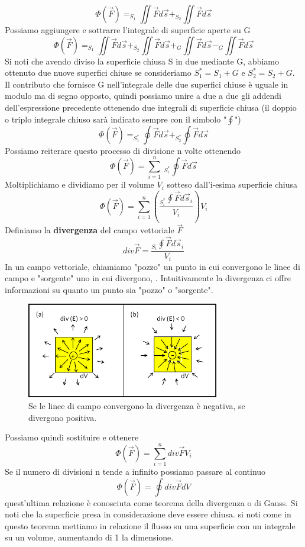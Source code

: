 \documentclass[10pt,a4paper]{article}
\begin{document}
\[\Phi(\vec{F}) = _{S_1}\iint \vec{F}d\vec{s}+_{S_2}\iint \vec{F}d\vec{s}\]
Possiamo aggiungere e sottrarre l'integrale di superficie aperte su G 
\[\Phi(\vec{F}) = _{S_1}\iint \vec{F}d\vec{s}+_{S_2}\iint \vec{F}d\vec{s}+_{G}\iint \vec{F}d\vec{s}-_{G}\iint \vec{F}d\vec{s}\]
Si noti che avendo diviso la superficie chiusa S in due mediante G, abbiamo ottenuto due nuove superfici chiuse se consideriamo \(S_1^* = S_1+G\) e \(S_2^* = S_2+G\). Il contributo che fornisce G nell'integrale delle due superfici chiuse è uguale in modulo ma di segno opposto, quindi possiamo unire a due a due gli addendi dell'espressione precedente ottenendo due integrali di superficie chiusa (il doppio o triplo integrale chiuso sarà indicato sempre con il simbolo "\(\oint\)")
\[\Phi(\vec{F}) = _{S_1^*}\oint \vec{F}d\vec{s}+_{S_2^*}\oint \vec{F}d\vec{s}\]
Possiamo reiterare questo processo di divisione n volte ottenendo
\[\Phi(\vec{F}) = \sum_{i=1}^{n}\ _{S_i^*}\oint \vec{F}d\vec{s}\]
Moltiplichiamo e dividiamo per il volume \(V_i\) sotteso dall'i-esima superficie chiusa
\[\Phi(\vec{F}) = \sum_{i=1}^{n}\left(\frac{_{S_i^*}\oint \vec{F}d\vec{s}_i}{V_i}\right)V_i\]
Definiamo la \textbf{divergenza} del campo vettoriale $\vec{F}$ 
\[div\vec{F} = \frac{_{S_i}\oint \vec{F}d\vec{s}_i}{V_i}\]
In un campo vettoriale, chiamiamo "pozzo" un punto in cui convergono le linee di campo e "sorgente" uno in cui divergono, . Intuitivamente la divergenza ci offre informazioni su quanto un punto sia "pozzo" o "sorgente". 
\begin{figure}[h!]
	\centering
	\includegraphics[width=0.6\linewidth]{images/div}
	\caption{Se le linee di campo convergono la divergenza è negativa, se divergono positiva.}
	\label{fig:div}
\end{figure}
\FloatBarrier
Possiamo quindi sostituire e ottenere
\[\Phi(\vec{F}) = \sum_{i=1}^{n}div\vec{F}V_i\]
Se il numero di divisioni n tende a infinito possiamo passare al continuo 
\[\Phi(\vec{F}) = \oint div\vec{F}dV\]
quest'ultima relazione è conosciuta come teorema della divergenza o di Gauss. Si noti che la superficie presa in considerazione deve essere chiusa. si noti come in questo teorema mettiamo in relazione il flusso su una superficie con un integrale su un volume, aumentando di 1 la dimensione.\\
\end{document}
